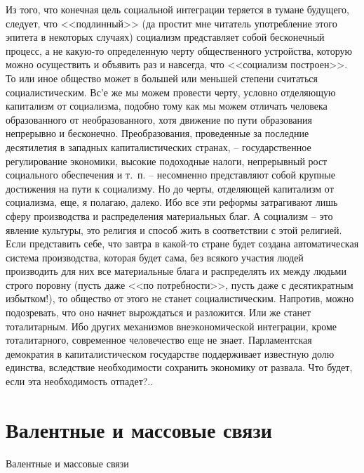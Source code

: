 \documentclass{book}
\begin{document}
Из того, что конечная цель социальной интеграции теряется в тумане будущего, следует, что <<подлинный>> (да простит мне читатель употребление этого эпитета в некоторых случаях) социализм представляет собой бесконечный процесс, а не какую-то определенную черту общественного устройства, которую можно осуществить и объявить раз и навсегда, что <<социализм построен>>. То или иное общество может в большей или мень­шей степени считаться социалистическим. Вс'е же мы можем провести черту, условно отделяющую капитализм от социализ­ма, подобно тому как мы можем отличать человека образо­ванного от необразованного, хотя движение по пути образо­вания непрерывно и бесконечно. Преобразования, проведенные за последние десятилетия в западных капиталистических стра­нах, -- государственное регулирование экономики, высокие по­доходные налоги, непрерывный рост социального обеспечения и т.~п. -- несомненно представляют собой крупные достижения на пути к социализму. Но до черты, отделяющей капитализм от социализма, еще, я полагаю, 
далеко. Ибо все эти реформы за­трагивают лишь сферу производства и распределения матери­альных благ. А социализм -- это явление культуры, это религия и способ жить в соответствии с этой религией. Если предста­вить себе, что завтра в какой-то стране будет создана автомати­ческая система производства, которая будет сама, без всякого участия людей  производить для них все материальные блага и распределять их между людьми строго поровну (пусть даже <<по потребности>>, пусть даже с десятикратным избытком!), то общество от этого не станет социалистическим. Напротив, можно подозревать, что оно начнет вырождаться и разложится. Или же станет тоталитарным. Ибо других механизмов внеэконо­мической интеграции, кроме тоталитарного, современное чело­вечество еще не знает. Парламентская демократия в капитали­стическом государстве поддерживает известную долю единства, вследствие необходимости сохранить экономику от развала. Что будет, если эта необходимость отпадет?..



\section{Валентные и массовые связи}

Валентные и массовые связи
\end{document}
